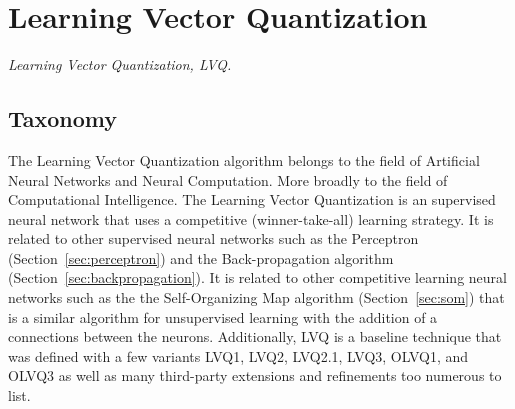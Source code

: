 

\section{Learning Vector Quantization} 
\label{sec:lvq}

\emph{Learning Vector Quantization, LVQ.}

\subsection{Taxonomy}
The Learning Vector Quantization algorithm belongs to the field of Artificial Neural Networks and Neural Computation. More broadly to the field of Computational Intelligence.  
The Learning Vector Quantization is an supervised neural network that uses a competitive (winner-take-all) learning strategy.
It is related to other supervised neural networks such as the Perceptron (Section~\ref{sec:perceptron}) and the Back-propagation algorithm (Section~\ref{sec:backpropagation}).
It is related to other competitive learning neural networks such as the the Self-Organizing Map algorithm (Section~\ref{sec:som}) that is a similar algorithm for unsupervised learning with the addition of a connections between the neurons.
Additionally, LVQ is a baseline technique that was defined with a few variants LVQ1, LVQ2, LVQ2.1, LVQ3, OLVQ1, and OLVQ3 as well as many third-party extensions and refinements too numerous to list.

